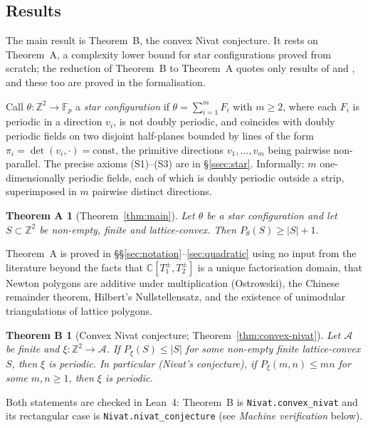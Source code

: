 \documentclass[11pt,reqno]{amsart}
\theoremstyle{plain}
\theoremstyle{definition}
\theoremstyle{remark}
\theoremstyle{plain}
\newtheorem*{thmA}{Theorem A}
\newtheorem*{thmB}{Theorem B}
\theoremstyle{remark}
\theoremstyle{definition}
\numberwithin{equation}{section}
\newcommand{\Z}{\mathbb{Z}}
\newcommand{\C}{\mathbb{C}}
\newcommand{\Fp}{\mathbb{F}_p}
\newcommand{\cA}{\mathcal{A}}
\begin{document}
\subsection*{Results}

The main result is Theorem~B, the convex Nivat conjecture.  It rests on
Theorem~A, a complexity lower bound for star configurations proved from
scratch; the reduction of Theorem~B to Theorem~A quotes only results of
\cite{KS} and \cite{Colle23a}, and these too are proved in the formalisation.

Call $\theta\colon\Z^2\to\Fp$ a \emph{star configuration} if
$\theta=\sum_{i=1}^mF_i$ with $m\ge2$, where each $F_i$ is periodic in a
direction $v_i$, is not doubly periodic, and coincides with doubly periodic
fields on two disjoint half-planes bounded by lines of the form
$\pi_i=\det(v_i,\cdot)=\text{const}$, the primitive
directions $v_1,\dots,v_m$ being pairwise non-parallel.  The precise axioms
\textup{(S1)}--\textup{(S3)} are in \S\ref{ssec:star}.  Informally: $m$
one-dimensionally periodic fields, each of which is doubly periodic outside a
strip, superimposed in $m$ pairwise distinct directions.

\begin{thmA}[Theorem~\ref{thm:main}]
Let $\theta$ be a star configuration and let $S\subset\Z^2$ be non-empty,
finite and lattice-convex.  Then $P_\theta(S)\ge|S|+1$.
\end{thmA}

Theorem~A is proved in \S\S\ref{sec:notation}--\ref{sec:quadratic} using no
input from the literature beyond the facts that $\C[T_1^{\pm},T_2^{\pm}]$ is a
unique factorisation domain, that Newton polygons are additive under
multiplication (Ostrowski), the Chinese remainder theorem, Hilbert's
Nullstellensatz, and the existence of unimodular triangulations of lattice
polygons.

\begin{thmB}[Convex Nivat conjecture; Theorem~\ref{thm:convex-nivat}]
Let $\cA$ be finite and $\xi\colon\Z^2\to\cA$.  If $P_\xi(S)\le|S|$
for some non-empty finite lattice-convex $S$, then $\xi$ is periodic.
In particular \textup{(}Nivat's conjecture\textup{)}, if $P_\xi(m,n)\le mn$ for
some $m,n\ge1$, then $\xi$ is periodic.
\end{thmB}

Both statements are checked in Lean~4: Theorem~B is \texttt{Nivat.convex\_nivat}
and its rectangular case is \texttt{Nivat.nivat\_conjecture} (see
\emph{Machine verification} below).
\end{document}
